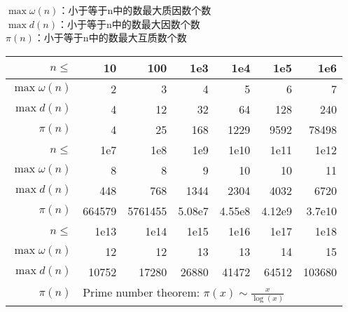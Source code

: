 \begin{center}
    $\max\omega(n)$：小于等于n中的数最大质因数个数\\
    $\max d(n)$：小于等于n中的数最大因数个数\\
    $\pi(n)$：小于等于n中的数最大互质数个数\\
    \begin{tabular}{|r|r|r|r|r|r|r|}  
        \hline
        \rowcolor{gray!20}
        $n\leq$         & 10        & 100       & 1e3       & 1e4       & 1e5       & 1e6           \\ \hline  
        $\max\omega(n)$ & 2         & 3         & 4         & 5         & 6         & 7             \\ \hline 
        $\max d(n)$     & 4         & 12        & 32        & 64        & 128       & 240           \\ \hline 
        $\pi(n)$        & 4         & 25        & 168       & 1229      & 9592      & 78498         \\ \hline 
        \rowcolor{gray!20}
        $n\leq$         & 1e7       & 1e8       & 1e9       & 1e10      & 1e11      & 1e12          \\ \hline 
        $\max\omega(n)$ & 8         & 8         & 9         & 10        & 10        & 11            \\ \hline 
        $\max d(n)$     & 448       & 768       & 1344      & 2304      & 4032      & 6720          \\ \hline 
        $\pi(n)$        & 664579    & 5761455   & 5.08e7    & 4.55e8    & 4.12e9    & 3.7e10        \\ \hline 
        \rowcolor{gray!20}
        $n\leq$         & 1e13      & 1e14      & 1e15      & 1e16      & 1e17      & 1e18          \\ \hline 
        $\max\omega(n)$ & 12        & 12        & 13        & 13        & 14        & 15            \\ \hline 
        $\max d(n)$     & 10752     & 17280     & 26880     & 41472     & 64512     & 103680        \\ \hline 
        $\pi(n)$        & \multicolumn{5}{l}{Prime number theorem: $\pi(x) \sim \frac{x}{\log(x)}$}&\\ \hline 
    \end{tabular}
\end{center}